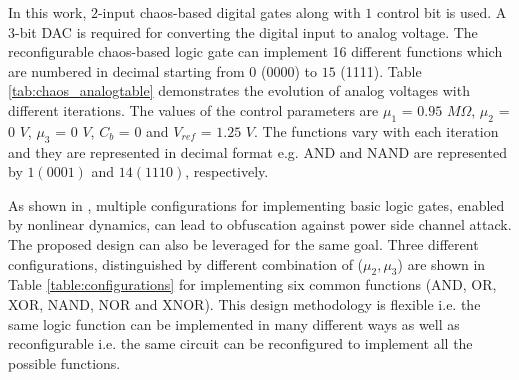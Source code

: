 \documentclass[conference]{IEEEtran}
\begin{document}
In this work, $2$-input chaos-based digital gates along with $1$ control bit is used. A $3$-bit DAC is required for converting the digital input to analog voltage. The reconfigurable chaos-based logic gate can implement 16 different functions which are numbered in decimal starting from $0$ (0000) to $15$ (1111). Table \ref{tab:chaos_analogtable} demonstrates the evolution of analog voltages with different iterations. The values of the control parameters are $\mu_1$ = $0.95$ $M\Omega$, $\mu_2$ = $0$ $V$, $\mu_3$ = $0$ $V$, $C_b$ = $0$ and $V_{ref}$ = $1.25$ $V$. The functions vary with each iteration and they are represented in decimal format e.g. AND and NAND are represented by $1 (0001)$ and $14(1110)$, respectively.
\begin{table}
  \centering
  \caption{\small{Evolution of chaotic output with different iterations ($\mu_1$ = $0.95$ $M\Omega$, $\mu_2$ = $0$ V, $\mu_3$ = $0$ $V$, $C_b=0$, $V_{ref}$ = $1.25$ $V$). Functions represented in decimal value.}}
  \label{tab:chaos_analogtable}
\end{table}
As shown in \cite{hasan2020chaos}, multiple configurations  for implementing basic logic gates, enabled by nonlinear dynamics, can lead to obfuscation against power side channel attack. The proposed design can also be leveraged for the same goal. Three different configurations, distinguished by different combination of ($\mu_2,\mu_3$) are shown in  Table \ref{table:configurations} for implementing six common functions (AND, OR, XOR, NAND, NOR and XNOR). This design methodology is flexible i.e. the same logic function can be implemented in many different ways as well as reconfigurable i.e. the same circuit can be reconfigured to implement all the possible functions.    
\end{document}
